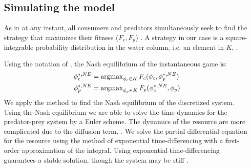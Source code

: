 \subsection{Simulating the model}




As in  at any instant, all consumers and predators simultaneously seek to find the strategy that maximizes their fitness ($F_c, F_p$) . A strategy in our case is a square-integrable probability distribution in the water column, i.e. an element in $K$, .

Using the notation of , the Nash equilibrium of the instantaneous game is:
\begin{equation}
  \label{eq:nash_equilibria}
  \begin{split}
  	\phi_c^{*,NE} &=  \argmax_{\phi_c \in K}  F_c(\phi_c, \phi_p^{*,NE}) \\
  	\phi_p^{*,NE} &=  \argmax_{\phi_p \in K} F_p(\phi_c^{*,NE}, \phi_p)
  \end{split}
\end{equation}
We apply the method  to find the Nash equilibrium of the discretized system. Using the Nash equilibrium  we are able to solve the time-dynamics for the predator-prey system  by a Euler scheme. The dynamics of the resource are more complicated due to the diffusion term, . We solve the partial differential equation for the resource using the method of exponential time-differencing \citep{hochbruck2010exponential} with a first-order approximation of the integral. Using exponential time-differencing guarantees a stable solution, though the system may be stiff \cite{hochbruck2010exponential}.

